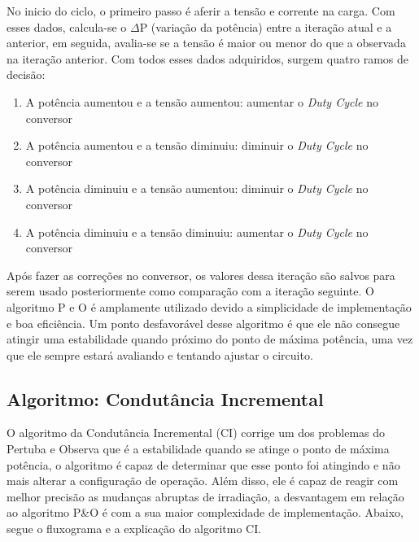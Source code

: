 No inicio do ciclo, o primeiro passo é aferir a tensão e corrente na carga. Com esses dados, calcula-se o $\Delta$P (variação da potência) entre a iteração atual e a anterior, em seguida, avalia-se se a tensão é maior ou menor do que a observada na iteração anterior. Com todos esses dados adquiridos, surgem quatro ramos de decisão:
\begin{enumerate}
    \item A potência aumentou e a tensão aumentou: aumentar o \textit{Duty Cycle} no conversor 
    \item A potência aumentou e a tensão diminuiu: diminuir o \textit{Duty Cycle} no conversor
    \item A potência diminuiu e a tensão aumentou: diminuir o \textit{Duty Cycle} no conversor
    \item A potência diminuiu e a tensão diminuiu: aumentar o \textit{Duty Cycle} no conversor
\end{enumerate}

Após fazer as correções no conversor, os valores dessa iteração são salvos para serem usado posteriormente como comparação com a iteração seguinte. O algoritmo P e O é amplamente utilizado devido a simplicidade de implementação e boa eficiência. Um ponto desfavorável desse algoritmo é que ele não consegue atingir uma estabilidade quando próximo do ponto de máxima potência, uma vez que ele sempre estará avaliando e tentando ajustar o circuito.

\subsection{Algoritmo: Condutância Incremental}

O algoritmo da Condutância Incremental (CI) corrige um dos problemas do Pertuba e Observa que é a estabilidade quando se atinge o ponto de máxima potência, o algoritmo é capaz de determinar que esse ponto foi atingindo e não mais alterar a configuração de operação. Além disso, ele é capaz de reagir com melhor precisão as mudanças abruptas de irradiação, a desvantagem em relação ao algoritmo P\&O é com a sua maior complexidade de implementação. Abaixo, segue o fluxograma e a explicação do algoritmo CI.

